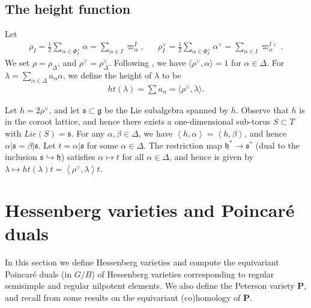 \documentclass[10pt]{article}
\numberwithin{thm}{section}
\theoremstyle{definition}
\theoremstyle{remark}
\newcommand{\Pet}{\ensuremath{\mathbf{P}}}
\newcommand{\Hom}{\operatorname{Hom}}
\newcommand{\g}{\ensuremath{\mathfrak g}}
\newcommand{\car}{\ensuremath{\mathfrak h}}
\newcommand{\IC}{\mathbb C}
\begin{document}
\subsection{The height function}
\label{htFn}
Let
\begin{align*}
\rho_I=\frac 12\sum_{\alpha\in\Phi_I^+}\alpha=\sum_{\alpha\in I}\varpi_\alpha^I, && \rho_I^\vee=\frac 12\sum_{\alpha\in\Phi_I^+}\alpha^\vee=\sum_{\alpha\in I}\varpi_\alpha^{I\vee}.
\end{align*}
We set $\rho=\rho_\Delta$, and $\rho^\vee=\rho^\vee_\Delta$.
%
Following \cite[Ch~6, Prop 29]{bourbaki:Lie46},
we have $\langle \rho^\vee,\alpha\rangle=1$ for $\alpha\in\Delta$.
For $\lambda=\sum_{\alpha\in\Delta}a_\alpha\alpha$, %
we define the height of $\lambda$ to be
\begin{align*}
ht(\lambda)=\sum a_\alpha=\langle\rho^\vee,\lambda\rangle.
\end{align*}

Let $h=2\rho^\vee$, and let $\mathfrak s\subset\g$ be the Lie subalgebra spanned by $h$.
Observe that $h$ is in the coroot lattice,
and hence there exists a one-dimensional sub-torus $S\subset T$ with $Lie(S)=\mathfrak s$.
For any $\alpha,\beta\in\Delta$, we have $\left\langle h,\alpha\right\rangle=\left\langle h,\beta\right\rangle$,
and hence $\alpha|\mathfrak s=\beta|\mathfrak s$.
Let $t=\alpha|\mathfrak s$ for some $\alpha\in\Delta$.
The restriction map $\car^*\to\mathfrak s^*$ (dual to the inclusion $\mathfrak s\hookrightarrow\car$)
satisfies $\alpha\mapsto t$ for all $\alpha\in\Delta$,
and hence is given by
$\lambda\mapsto ht(\lambda)t=\left\langle\rho^\vee,\lambda\right\rangle t$.


\section{Hessenberg varieties and Poincar\'e duals}
\label{sec:Hessenberg}
In this section we define Hessenberg varieties
and compute the equivariant Poincar\'e duals (in $G/B$) of Hessenberg varieties corresponding to regular semisimple and regular nilpotent elements.
We also define the Peterson variety \Pet,
and recall from \cite{gms:peterson} some results on the equivariant (co)homology of \Pet.
\end{document}
